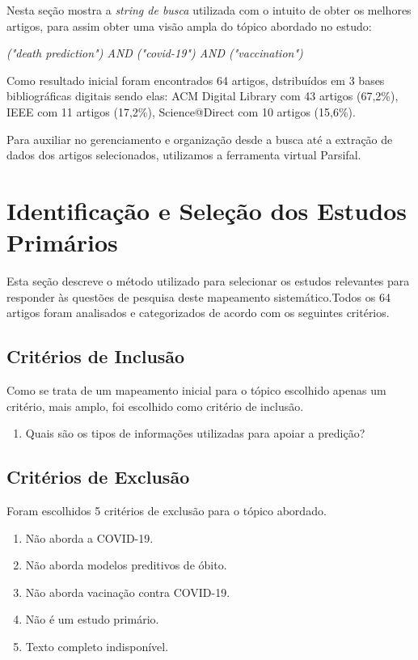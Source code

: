 Nesta seção mostra a \textit{string de busca} utilizada com o intuito de obter os melhores artigos, para assim obter uma visão ampla do tópico abordado no estudo:

\begin{center}
    \textit{("death prediction") AND ("covid-19") AND ("vaccination")}
\end{center}

Como resultado inicial foram encontrados 64 artigos, dstribuídos em 3 bases bibliográficas digitais sendo elas: ACM Digital Library com 43 artigos (67,2\%), IEEE com 11 artigos (17,2\%), Science@Direct com 10 artigos (15,6\%).

Para auxiliar no gerenciamento e organização desde a busca até a extração de dados dos artigos selecionados, utilizamos a ferramenta virtual Parsifal.

\section{Identificação e Seleção dos Estudos Primários}

Esta seção descreve o método utilizado para selecionar os estudos relevantes para responder às questões de pesquisa deste mapeamento sistemático.Todos os 64 artigos foram analisados e categorizados de acordo com os seguintes critérios.

\subsection{Critérios de Inclusão}

Como se trata de um mapeamento inicial para o tópico escolhido apenas um critério, mais amplo, foi escolhido como critério de inclusão.

\begin{enumerate}
    \item Quais são os tipos de informações utilizadas para apoiar a predição?
\end{enumerate}

\subsection{Critérios de Exclusão}

Foram escolhidos 5 critérios de exclusão para o tópico abordado.

\begin{enumerate}
    \item Não aborda a COVID-19.
    \item Não aborda modelos preditivos de óbito.
    \item Não aborda vacinação contra COVID-19.
    \item Não é um estudo primário.
    \item Texto completo indisponível.
\end{enumerate}

